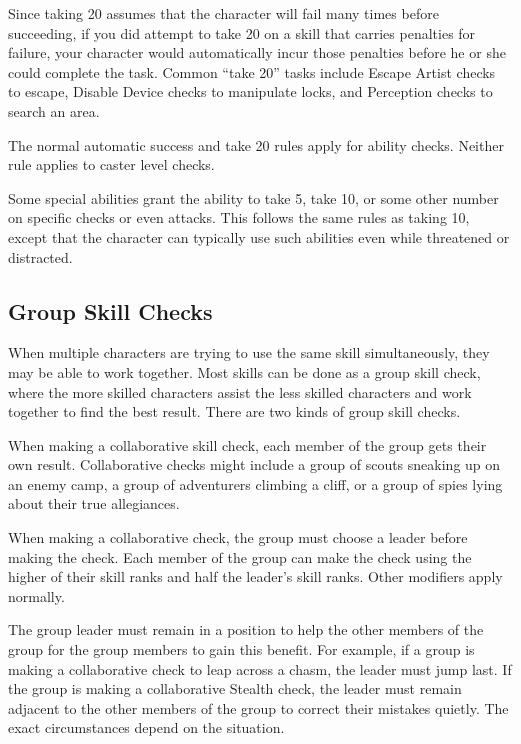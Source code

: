 Since taking 20 assumes that the character will fail many times before succeeding, if you did attempt to take 20 on a skill that carries penalties for failure, your character would automatically incur those penalties before he or she could complete the task. Common ``take 20'' tasks include Escape Artist checks to escape, Disable Device checks to manipulate locks, and Perception checks to search an area.

 The normal automatic success and take 20 rules apply for ability checks. Neither rule applies to caster level checks.

 Some special abilities grant the ability to take 5, take 10, or some other number on specific checks or even attacks. This follows the same rules as taking 10, except that the character can typically use such abilities even while threatened or distracted.

\subsection{Group Skill Checks}
When multiple characters are trying to use the same skill simultaneously, they may be able to work together. Most skills can be done as a group skill check, where the more skilled characters assist the less skilled characters and work together to find the best result. There are two kinds of group skill checks.

 When making a collaborative skill check, each member of the group gets their own result. Collaborative checks might include a group of scouts sneaking up on an enemy camp, a group of adventurers climbing a cliff, or a group of spies lying about their true allegiances.

When making a collaborative check, the group must choose a leader before making the check. Each member of the group can make the check using the higher of their skill ranks and half the leader's skill ranks. Other modifiers apply normally.

The group leader must remain in a position to help the other members of the group for the group members to gain this benefit. For example, if a group is making a collaborative check to leap across a chasm, the leader must jump last. If the group is making a collaborative Stealth check, the leader must remain adjacent to the other members of the group to correct their mistakes quietly. The exact circumstances depend on the situation. 

